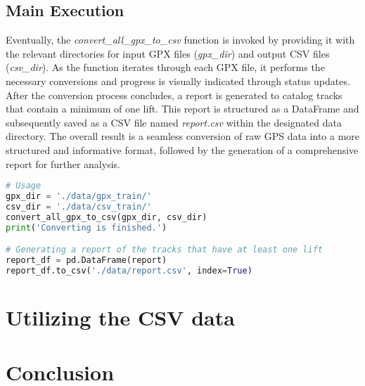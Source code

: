 \subsection{Main Execution}
\label{sec:data:main}

Eventually, the \textit{convert\_all\_gpx\_to\_csv} function is invoked by providing it with the relevant directories for input GPX files (\textit{gpx\_dir}) and output CSV files (\textit{csv\_dir}). 
As the function iterates through each GPX file, it performs the necessary conversions and progress is visually indicated through status updates. After the conversion process concludes, 
a report is generated to catalog tracks that contain a minimum of one lift. This report is structured as a DataFrame and subsequently saved as a CSV file named 
\textit{report.csv} within the designated data directory. The overall result is a seamless conversion of raw 
GPS data into a more structured and informative format, followed by the generation of a comprehensive report for further analysis.

\begin{lstlisting}[language=Python]
# Usage
gpx_dir = './data/gpx_train/'
csv_dir = './data/csv_train/'
convert_all_gpx_to_csv(gpx_dir, csv_dir)
print('Converting is finished.')

# Generating a report of the tracks that have at least one lift
report_df = pd.DataFrame(report)
report_df.to_csv('./data/report.csv', index=True)
\end{lstlisting}


\section{Utilizing the CSV data}
\label{sec:data-csv}


\section{Conclusion}
\label{sec:data:conclusion}


